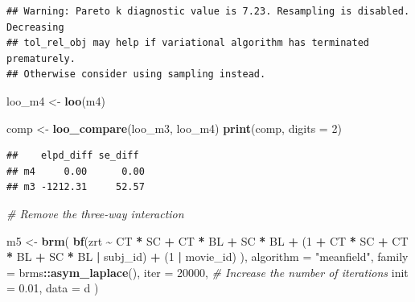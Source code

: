 \documentclass[
]{article}
\newenvironment{Shaded}{\begin{snugshade}}{\end{snugshade}}
\newcommand{\AttributeTok}[1]{\textcolor[rgb]{0.13,0.29,0.53}{#1}}
\newcommand{\CommentTok}[1]{\textcolor[rgb]{0.56,0.35,0.01}{\textit{#1}}}
\newcommand{\DecValTok}[1]{\textcolor[rgb]{0.00,0.00,0.81}{#1}}
\newcommand{\FloatTok}[1]{\textcolor[rgb]{0.00,0.00,0.81}{#1}}
\newcommand{\FunctionTok}[1]{\textcolor[rgb]{0.13,0.29,0.53}{\textbf{#1}}}
\newcommand{\NormalTok}[1]{#1}
\newcommand{\OtherTok}[1]{\textcolor[rgb]{0.56,0.35,0.01}{#1}}
\newcommand{\SpecialCharTok}[1]{\textcolor[rgb]{0.81,0.36,0.00}{\textbf{#1}}}
\newcommand{\StringTok}[1]{\textcolor[rgb]{0.31,0.60,0.02}{#1}}
\begin{document}
\begin{verbatim}
## Warning: Pareto k diagnostic value is 7.23. Resampling is disabled. Decreasing
## tol_rel_obj may help if variational algorithm has terminated prematurely.
## Otherwise consider using sampling instead.
\end{verbatim}

\begin{Shaded}
\begin{Highlighting}[]
\NormalTok{loo\_m4 }\OtherTok{\textless{}{-}} \FunctionTok{loo}\NormalTok{(m4)}


\NormalTok{comp }\OtherTok{\textless{}{-}} \FunctionTok{loo\_compare}\NormalTok{(loo\_m3, loo\_m4)}
\FunctionTok{print}\NormalTok{(comp, }\AttributeTok{digits =} \DecValTok{2}\NormalTok{)}
\end{Highlighting}
\end{Shaded}

\begin{verbatim}
##    elpd_diff se_diff 
## m4     0.00      0.00
## m3 -1212.31     52.57
\end{verbatim}

\begin{Shaded}
\begin{Highlighting}[]
\CommentTok{\# Remove the three{-}way interaction}

\NormalTok{m5 }\OtherTok{\textless{}{-}} \FunctionTok{brm}\NormalTok{(}
  \FunctionTok{bf}\NormalTok{(zrt }\SpecialCharTok{\textasciitilde{}}\NormalTok{ CT }\SpecialCharTok{*}\NormalTok{ SC }\SpecialCharTok{+}\NormalTok{ CT }\SpecialCharTok{*}\NormalTok{ BL }\SpecialCharTok{+}\NormalTok{ SC }\SpecialCharTok{*}\NormalTok{ BL }\SpecialCharTok{+} 
\NormalTok{       (}\DecValTok{1} \SpecialCharTok{+}\NormalTok{ CT }\SpecialCharTok{*}\NormalTok{ SC }\SpecialCharTok{+}\NormalTok{ CT }\SpecialCharTok{*}\NormalTok{ BL }\SpecialCharTok{+}\NormalTok{ SC }\SpecialCharTok{*}\NormalTok{ BL }\SpecialCharTok{|}\NormalTok{ subj\_id) }\SpecialCharTok{+}\NormalTok{ (}\DecValTok{1} \SpecialCharTok{|}\NormalTok{ movie\_id)}
\NormalTok{  ), }
  \AttributeTok{algorithm =} \StringTok{"meanfield"}\NormalTok{,}
  \AttributeTok{family =}\NormalTok{ brms}\SpecialCharTok{::}\FunctionTok{asym\_laplace}\NormalTok{(),}
  \AttributeTok{iter =} \DecValTok{20000}\NormalTok{, }\CommentTok{\# Increase the number of iterations}
  \AttributeTok{init =} \FloatTok{0.01}\NormalTok{,}
  \AttributeTok{data =}\NormalTok{ d}
\NormalTok{)}
\end{Highlighting}
\end{Shaded}
\end{document}
